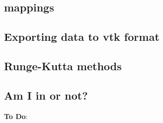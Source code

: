 \documentclass[a4paper]{article}
\begin{document}
\newpage %
\subsection{mappings}  %

\newpage %
\subsection{Exporting data to vtk format}  %

\newpage %
\subsection{Runge-Kutta methods}  %

\newpage %
\subsection{Am I in or not?}  %





\newpage
{\bf To Do}:
\end{document}
